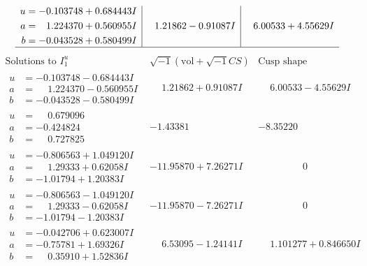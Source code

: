 \documentclass[1p]{elsarticle_modified}
\theoremstyle{definition}
\newcommand{\I}{\sqrt{-1}}
\begin{document}
$$\begin{array}{c|c|c}
\begin{aligned}
u &= -0.103748 + 0.684443 I \\
a &= \phantom{-}1.224370 + 0.560955 I \\
b &= -0.043528 + 0.580499 I\end{aligned}
 & \phantom{-}1.21862 - 0.91087 I & \phantom{-}6.00533 + 4.55629 I\\
 \hline 
 \end{array}$$\newpage$$\begin{array}{c|c|c}  
\text{Solutions to }I^u_{1}& \I (\text{vol} + \sqrt{-1}CS) & \text{Cusp shape}\\
 \hline 
\begin{aligned}
u &= -0.103748 - 0.684443 I \\
a &= \phantom{-}1.224370 - 0.560955 I \\
b &= -0.043528 - 0.580499 I\end{aligned}
 & \phantom{-}1.21862 + 0.91087 I & \phantom{-}6.00533 - 4.55629 I \\ \hline\begin{aligned}
u &= \phantom{-}0.679096\phantom{ +0.000000I} \\
a &= -0.424824\phantom{ +0.000000I} \\
b &= \phantom{-}0.727825\phantom{ +0.000000I}\end{aligned}
 & -1.43381\phantom{ +0.000000I} & -8.35220\phantom{ +0.000000I} \\ \hline\begin{aligned}
u &= -0.806563 + 1.049120 I \\
a &= \phantom{-}1.29333 + 0.62058 I \\
b &= -1.01794 + 1.20383 I\end{aligned}
 & -11.95870 + 7.26271 I & \phantom{-0.000000 } 0 \\ \hline\begin{aligned}
u &= -0.806563 - 1.049120 I \\
a &= \phantom{-}1.29333 - 0.62058 I \\
b &= -1.01794 - 1.20383 I\end{aligned}
 & -11.95870 - 7.26271 I & \phantom{-0.000000 } 0 \\ \hline\begin{aligned}
u &= -0.042706 + 0.623007 I \\
a &= -0.75781 + 1.69326 I \\
b &= \phantom{-}0.35910 + 1.52836 I\end{aligned}
 & \phantom{-}6.53095 - 1.24141 I & \phantom{-}1.101277 + 0.846650 I \\ \hline\begin{aligned}

\end{aligned}
\end{array}$$
\end{document}

